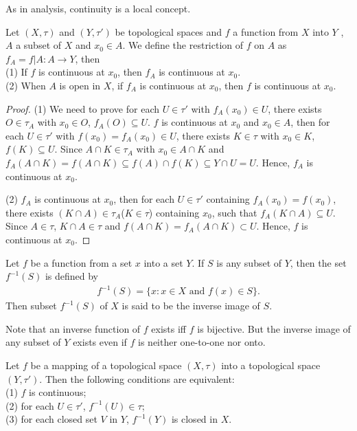 As in analysis, continuity is a local concept. 
\begin{proposition}{}{}
    Let $(X,\tau)$ and $(Y,\tau')$ be topological spaces and $f$ a function from $X$ into $Y$ , $A$ a subset of $X$ and $x_0\in A$.
    We define the restriction of $f$ on $A$ as $f_A = f|A:A\rightarrow Y$, then\\
    (1) If $f$ is continuous at $x_0$, then $f_A$ is continuous at $x_0$.\\
    (2) When $A$ is open in $X$, if $f_A$ is continuous at $x_0$, then $f$ is continuous at $x_0$.
\end{proposition}

\begin{proof}
    (1) We need to prove for each $U\in \tau'$ with $f_A(x_0)\in U$, there exists $O\in \tau_A$ with $x_0\in O$, $f_A(O)\subseteq U$.
    $f$ is continuous at $x_0$ and $x_0\in A$, then for each $U\in \tau'$ with $f(x_0)=f_A(x_0)\in U$, there exists $K\in \tau$ with $x_0\in K$, $f(K)\subseteq U$.
    Since $A\cap K\in \tau_A$ with $x_0\in A\cap K$ and $f_A(A\cap K) = f(A\cap K)\subseteq f(A)\cap f(K)\subseteq Y\cap U= U$. Hence, $f_A$ is continuous at $x_0$.
    \par
    (2) $f_A$ is continuous at $x_0$, then for each $U\in\tau'$ containing $f_A(x_0)=f(x_0)$, there exists $(K\cap A)\in \tau_A$($K\in\tau$) containing $x_0$, 
    such that $f_A(K\cap A)\subseteq U$. Since $A\in \tau$, $K\cap A\in \tau$ and $f(A\cap K)=f_A(A\cap K)\subset U$. Hence, $f$ is continuous at $x_0$. 
\end{proof}


\begin{definition}{}{}
    Let $f$ be a function from a set $x$ into a set $Y$. If $S$ is any subset of $Y$, 
    then the set $f^{-1}(S)$ is defined by
    \begin{align*}
        f^{-1}(S) = \{x:x\in X \text{ and } f(x)\in S\}.
    \end{align*}
    Then subset $f^{-1}(S)$ of $X$ is said to be the inverse image of $S$.
\end{definition}
\begin{remark}
    Note that an inverse function of $f$ exists iff $f$ is bijective. 
    But the inverse image of any subset of $Y$ exists even if $f$ is neither one-to-one nor onto.
\end{remark}

\begin{proposition}{}{}
    Let $f$ be a mapping of a topological space $(X,\tau)$ into a topological space $(Y,\tau')$. Then the following conditions are equivalent:\\
    (1) $f$ is continuous;\\
    (2) for each $U\in\tau'$, $f^{-1}(U)\in \tau$;\\
    (3) for each closed set $V$ in $Y$, $f^{-1}(Y)$ is closed in $X$.
\end{proposition}

